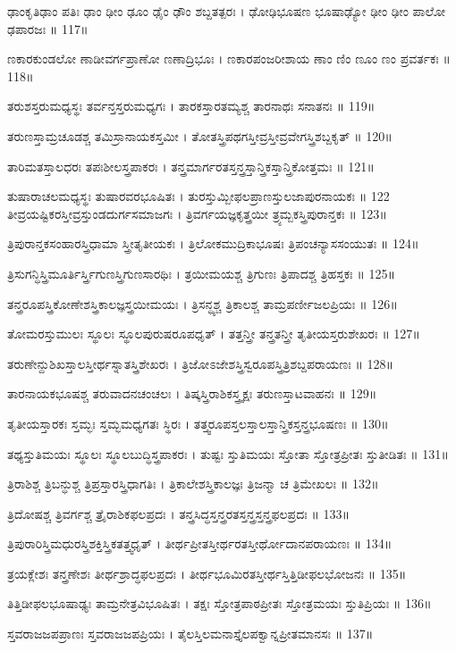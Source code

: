 ಢಾಂಕೃತಿಢಾಂ ಪತಿಃ ಢಾಂ ಢೀಂ ಢೂಂ ಢೈಂ ಢೌಂ ಶಬ್ದತತ್ಪರಃ ।
ಢೋಢಿಭೂಷಣ ಭೂಷಾಢ್ಯೋ ಢೀಂ ಢೀಂ ಪಾಲೋ ಢಪಾರಜಃ ॥ 117॥

ಣಕಾರಕುಂಡಲೋ ಣಾಡೀವರ್ಗಪ್ರಾಣೋ ಣಣಾದ್ರಿಭೂಃ ।
ಣಕಾರಪಂಜರೀಶಾಯ ಣಾಂ ಣಿಂ ಣೂಂ ಣಂ ಪ್ರವರ್ತಕಃ ॥ 118॥

ತರುಶಸ್ತರುಮಧ್ಯಸ್ಥಃ ತರ್ವನ್ತಸ್ತರುಮಧ್ಯಗಃ ।
ತಾರಕಸ್ತಾರತಮ್ಯಶ್ಚ ತಾರನಾಥಃ ಸನಾತನಃ ॥ 119॥

ತರುಣಸ್ತಾಮ್ರಚೂಡಶ್ಚ ತಮಿಸ್ರಾನಾಯಕಸ್ತಮೀ ।
ತೋತಸ್ತ್ರಿಪಥಗಸ್ತೀವ್ರಸ್ತೀವ್ರವೇಗಸ್ತ್ರಿಶಬ್ದಕೃತ್ ॥ 120॥

ತಾರಿಮತಸ್ತಾಲಧರಃ ತಪಃಶೀಲಸ್ತ್ರಪಾಕರಃ ।
ತನ್ತ್ರಮಾರ್ಗರತಸ್ತನ್ತ್ರಸ್ತಾನ್ತ್ರಿಕಸ್ತಾನ್ತ್ರಿಕೋತ್ತಮಃ ॥ 121॥

ತುಷಾರಾಚಲಮಧ್ಯಸ್ಥಃ ತುಷಾರವರಭೂಷಿತಃ ।
ತುರಸ್ತುಮ್ಬೀಫಲಪ್ರಾಣಸ್ತುಲಜಾಪುರನಾಯಕಃ ॥ 122
ತೀವ್ರಯಷ್ಟಿಕರಸ್ತೀವ್ರಸ್ತುಂಡದುರ್ಗಸಮಾಜಗಃ ।
ತ್ರಿವರ್ಗಯಜ್ಞಕೃತ್ತ್ರಯೀ ತ್ರ್ಯಮ್ಬಕಸ್ತ್ರಿಪುರಾನ್ತಕಃ ॥ 123॥

ತ್ರಿಪುರಾನ್ತಕಸಂಹಾರಸ್ತ್ರಿಧಾಮಾ ಸ್ತ್ರೀತೃತೀಯಕಃ ।
ತ್ರಿಲೋಕಮುದ್ರಿಕಾಭೂಷಃ ತ್ರಿಪಂಚನ್ಯಾಸಸಂಯುತಃ ॥ 124॥

ತ್ರಿಸುಗನ್ಧಿಸ್ತ್ರಿಮೂರ್ತಿರ್ಸ್ತ್ರಿಗುಣಸ್ತ್ರಿಗುಣಸಾರಥಿಃ ।
ತ್ರಯೀಮಯಶ್ಚ ತ್ರಿಗುಣಃ ತ್ರಿಪಾದಶ್ಚ ತ್ರಿಹಸ್ತಕಃ ॥ 125॥

ತನ್ತ್ರರೂಪಸ್ತ್ರಿಕೋಣೇಶಸ್ತ್ರಿಕಾಲಜ್ಞಸ್ತ್ರಯೀಮಯಃ ।
ತ್ರಿಸನ್ಧ್ಯಶ್ಚ ತ್ರಿಕಾಲಶ್ಚ ತಾಮ್ರಪರ್ಣೀಜಲಪ್ರಿಯಃ ॥ 126॥

ತೋಮರಸ್ತುಮುಲಃ ಸ್ಥೂಲಃ ಸ್ಥೂಲಪುರುಷರೂಪಧೃತ್ ।
ತತ್ತನ್ತ್ರೀ ತನ್ತ್ರತನ್ತ್ರೀ ತೃತೀಯಸ್ತರುಶೇಖರಃ ॥ 127॥

ತರುಣೇನ್ದುಶಿಖಸ್ತಾಲಸ್ತೀರ್ಥಸ್ನಾತಸ್ತ್ರಿಶೇಖರಃ ।
ತ್ರಿಜೋಽಜೇಶಸ್ತ್ರಿಸ್ವರೂಪಸ್ತ್ರಿತ್ರಿಶಬ್ದಪರಾಯಣಃ ॥ 128॥

ತಾರನಾಯಕಭೂಷಶ್ಚ ತರುವಾದನಚಂಚಲಃ ।
ತಿಷ್ಕಸ್ತ್ರಿರಾಶಿಕಸ್ತ್ರ್ಯಕ್ಷಃ ತರುಣಸ್ತಾಟವಾಹನಃ ॥ 129॥

ತೃತೀಯಸ್ತಾರಕಃ ಸ್ತಮ್ಭಃ ಸ್ತಮ್ಭಮಧ್ಯಗತಃ ಸ್ಥಿರಃ ।
ತತ್ತ್ವರೂಪಸ್ತಲಸ್ತಾಲಸ್ತಾನ್ತ್ರಿಕಸ್ತನ್ತ್ರಭೂಷಣಃ ॥ 130॥

ತಥ್ಯಸ್ತುತಿಮಯಃ ಸ್ಥೂಲಃ ಸ್ಥೂಲಬುದ್ಧಿಸ್ತ್ರಪಾಕರಃ ।
ತುಷ್ಟಃ ಸ್ತುತಿಮಯಃ ಸ್ತೋತಾ ಸ್ತೋತ್ರಪ್ರೀತಃ ಸ್ತುತೀಡಿತಃ ॥ 131॥

ತ್ರಿರಾಶಿಶ್ಚ ತ್ರಿಬನ್ಧುಶ್ಚ ತ್ರಿಪ್ರಸ್ತಾರಸ್ತ್ರಿಧಾಗತಿಃ ।
ತ್ರಿಕಾಲೇಶಸ್ತ್ರಿಕಾಲಜ್ಞಃ ತ್ರಿಜನ್ಮಾ ಚ ತ್ರಿಮೇಖಲಃ ॥ 132॥

ತ್ರಿದೋಷಶ್ಚ ತ್ರಿವರ್ಗಶ್ಚ ತ್ರೈರಾಶಿಕಫಲಪ್ರದಃ ।
ತನ್ತ್ರಸಿದ್ಧಸ್ತನ್ತ್ರರತಸ್ತನ್ತ್ರಸ್ತನ್ತ್ರಫಲಪ್ರದಃ ॥ 133॥

ತ್ರಿಪುರಾರಿಸ್ತ್ರಿಮಧುರಸ್ತ್ರಿಶಕ್ತಿಸ್ತ್ರಿಕತತ್ತ್ವಧೃತ್ ।
ತೀರ್ಥಪ್ರೀತಸ್ತೀರ್ಥರತಸ್ತೀರ್ಥೋದಾನಪರಾಯಣಃ ॥ 134॥

ತ್ರಯಕ್ಲೇಶಃ ತನ್ತ್ರಣೇಶಃ ತೀರ್ಥಶ್ರಾದ್ಧಫಲಪ್ರದಃ ।
ತೀರ್ಥಭೂಮಿರತಸ್ತೀರ್ಥಸ್ತಿತ್ತಿಡೀಫಲಭೋಜನಃ ॥ 135॥

ತಿತ್ತಿಡೀಫಲಭೂಷಾಢ್ಯಃ ತಾಮ್ರನೇತ್ರವಿಭೂಷಿತಃ ।
ತಕ್ಷಃ ಸ್ತೋತ್ರಪಾಠಪ್ರೀತಃ ಸ್ತೋತ್ರಮಯಃ ಸ್ತುತಿಪ್ರಿಯಃ ॥ 136॥

ಸ್ತವರಾಜಜಪಪ್ರಾಣಃ ಸ್ತವರಾಜಜಪಪ್ರಿಯಃ ।
ತೈಲಸ್ತಿಲಮನಾಸ್ತೈಲಪಕ್ವಾನ್ನಪ್ರೀತಮಾನಸಃ ॥ 137॥

